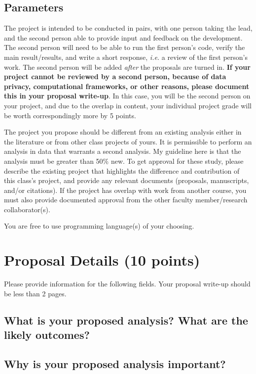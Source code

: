 \documentclass[twoside,11pt]{article}
\begin{document}
\subsection{Parameters}
The project is intended to be conducted in pairs, with one person taking the lead, and the second person able to provide input and feedback on the development. The second person will need to be able to run the first person's code, verify the main result/results, and write a short response, \emph{i.e.} a review of the first person's work. The second person will be added \emph{after} the proposals are turned in. \textbf{If your project cannot be reviewed by a second person, because of data privacy, computational frameworks, or other reasons, please document this in your proposal write-up}. In this case, you will be the second person on your project, and due to the overlap in content, your individual project grade will be worth correspondingly more by 5 points.

The project you propose should be different from an existing analysis either in the literature or from other class projects of yours. It is permissible to perform an analysis in data that warrants a second analysis. My guideline here is that the analysis must be greater than 50\% new. To get approval for these study, please describe the existing project that highlights the difference and contribution of this class's project, and provide any relevant documents (proposals, manuscripts, and/or citations). If the project has overlap with work from another course, you must also provide documented approval from the other faculty member/research collaborator(s). 

You are free to use programming language(s) of your choosing.

\section{Proposal Details (10 points)} \label{details}
Please provide information for the following fields. Your proposal write-up should be less than 2 pages.

\subsection{What is your proposed analysis? What are the likely outcomes?}


\subsection{Why is your proposed analysis important?}
\end{document}

